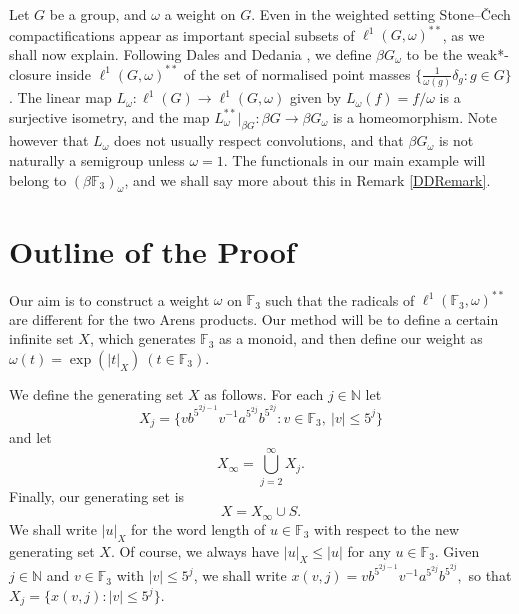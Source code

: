 \documentclass[twoside,11pt]{amsart}
\numberwithin{equation}{section}
\theoremstyle{definition}
\newcommand {\N}{\mathbb N}
\newcommand{\1}{\mathbbm{1}}
\newcommand{\F}{\mathbb F}
\begin{document}
	Let $G$ be a group, and $\omega$ a weight on $G$. Even in the weighted setting Stone--{\v C}ech compactifications appear as important special subsets of $\ell^1(G, \omega)^{**}$, as we shall now explain. Following Dales and Dedania \cite{DD}, we define $\beta G_\omega$ to be the weak*-closure inside $\ell^1(G, \omega)^{**}$ of the set of normalised point masses $\{ \frac{1}{\omega(g)} \delta_g : g \in G \}$. The linear map $L_\omega \colon \ell^1(G) \to \ell^1(G, \omega)$ given by $L_\omega(f) = f/\omega$ is a surjective isometry, and the map $L_\omega^{**}|_{\beta G} \colon \beta G \to \beta G_\omega$ is a homeomorphism. Note however that $L_\omega$ does not usually respect convolutions, and that $\beta G_\omega$ is not naturally a semigroup unless $\omega = 1$. The functionals in our main example will belong to $(\beta \F_3)_\omega$, and we shall say more about this in Remark \ref{DDRemark}.
	
	
	
	
	
	\section{Outline of the Proof}
	\noindent
	Our aim is to construct a weight $\omega$ on $\F_3$ such that the radicals of $\ell^1(\F_3, \omega)^{**}$ are different for the two Arens products. Our method will be to define a certain infinite set $X$,  which generates $\F_3$ as a monoid, and then define our weight as $\omega(t) = \exp(|t|_X) \ (t \in \F_3)$. 
	
	We define the generating set $X$ as follows. For each $j \in \N$ let
	$$X_j = \{ v b^{5^{2j-1}}v^{-1} a^{5^{2j}}b^{5^{2j}} : v \in \F_3, \  |v| \leq 5^j \}$$
	and let 
	$$X_\infty = \bigcup_{j = 2}^\infty X_j.$$
	Finally, our generating set is 
	$$X = X_\infty \cup S.$$
	We shall write $|u|_X$ for the word length of $u \in \F_3$ with respect to the new generating set $X$.
	Of course, we always have $|u|_X \leq |u|$ for any $u \in \F_3$. Given $j \in \N$ and $v \in \F_3$ with $|v| \leq 5^j$, we shall write 
	$x(v,j) = v  b^{5^{2j-1}}v^{-1} a^{5^{2j}}b^{5^{2j}},$
	so that $X_j = \{ x(v,j) : |v| \leq 5^j\}$.
	
\end{document}
